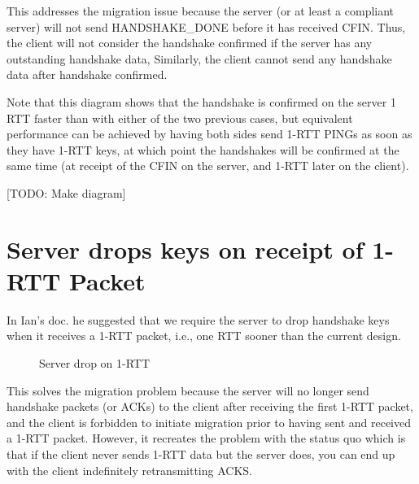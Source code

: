 \documentclass{article}
\begin{document}
This addresses the migration issue because the server (or at least
a compliant server) will not send HANDSHAKE\_DONE before it has
received CFIN. Thus, the client will not consider the handshake
confirmed if the server has any outstanding handshake data,
Similarly, the client cannot send any handshake data after handshake
confirmed.

Note that this diagram shows that the handshake is confirmed on the
server 1 RTT faster than with either of the two previous cases,
but equivalent performance can be achieved by having both
sides send 1-RTT PINGs as soon as they have 1-RTT keys,
at which point the handshakes will be confirmed at the same
time (at receipt of the CFIN on the server, and 1-RTT later
on the client).

[TODO: Make diagram]


\section{Server drops keys on receipt of 1-RTT Packet}
\label{sec:server-drops-keys}

In Ian's doc. he suggested that we require the server to drop
handshake keys when it receives a 1-RTT packet, i.e., one RTT
sooner than the current design.

\begin{figure}[H]
\begin{center}
\end{center}
\caption{Server drop on 1-RTT}
\label{fig:server-drop-on-10rtt}
\end{figure}


This solves the migration problem because the server will no
longer send handshake packets (or ACKs) to the client after
receiving the first 1-RTT packet, and the client is forbidden
to initiate migration prior to having sent and received a 1-RTT
packet. However, it recreates the problem with the status
quo which is that if the client never sends 1-RTT data but
the server does, you can end up with the client indefinitely
retransmitting ACKS.
\end{document}
